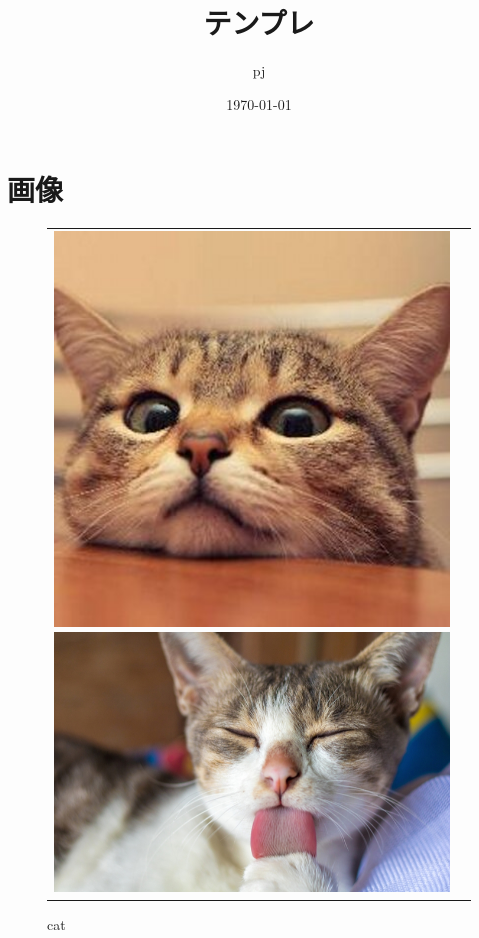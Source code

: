 \documentclass[11pt,a4paper,dvipdfmx]{jsarticle}
\title{テンプレ}
\author{pj}
\date{\today}
\begin{document}
\maketitle
   \section{画像}
         \begin{figure}[h!]
            \begin{tabular}{cc}
               \begin{minipage}[t]{0.5\hsize}
                  \centering
                  \includegraphics[scale=0.5]{./images/cat.jpeg}
                  \caption{cat}
                  \label{fig:cat}
               \end{minipage} 
               \begin{minipage}[t]{0.5\hsize}
                  \centering
                  \includegraphics[scale=0.5]{./images/cat2.jpg}

\end{minipage}
\end{tabular}
\end{figure}
\end{document}
